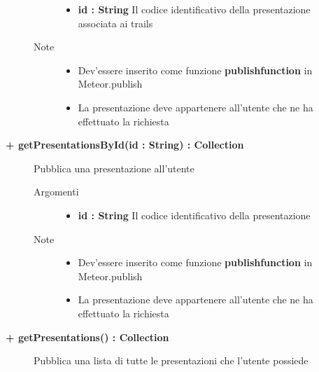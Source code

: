 \begin{description}
\begin{description}
\begin{description}
\begin{itemize}
					\item \textbf{id : String			} \hfill
					Il codice identificativo della presentazione associata ai trails
					
				\end{itemize}
			\item[Note] \hfill
			\begin{itemize}
					\item Dev'essere inserito come funzione \textbf{publishfunction} in Meteor.publish
					\item La presentazione deve appartenere all'utente che ne ha effettuato la richiesta
				\end{itemize}
		\end{description}
	\end{description}
	
	\begin{description}
		\item[\textbf{\color{blue}+ getPresentationsById(id : String) : Collection			}] \hfill
			Pubblica una presentazione all'utente
			
		\begin{description}
			\item[Argomenti] \hfill
				\begin{itemize}
				
					\item \textbf{id : String			} \hfill
					Il codice identificativo della presentazione
					
				\end{itemize}
			\item[Note] \hfill
			\begin{itemize}
					\item Dev'essere inserito come funzione \textbf{publishfunction} in Meteor.publish
					\item La presentazione deve appartenere all'utente che ne ha effettuato la richiesta
				\end{itemize}
		\end{description}
	\end{description}
	
	\begin{description}
		\item[\textbf{\color{blue}+ getPresentations() : Collection			}] \hfill
			Pubblica una lista di tutte le presentazioni che l'utente possiede
			

\end{description}
\end{description}

